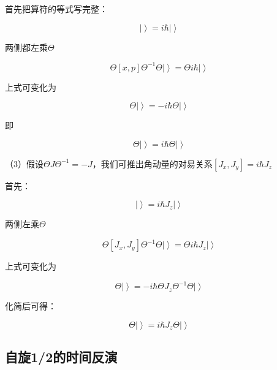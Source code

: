 首先把算符的等式写完整：

\begin{equation}
[x, p] \left| {} \right\rangle  = i \hbar \left| {} \right\rangle
\end{equation}

两侧都左乘$\Theta$

\begin{equation}
\Theta [x, p] \Theta^{-1} \Theta \left| {} \right\rangle = \Theta i \hbar \left| {} \right\rangle  
\end{equation}

上式可变化为

\begin{equation}
[x, -p] \Theta \left| {} \right\rangle = - i \hbar \Theta \left| {} \right\rangle
\end{equation}

即

\begin{equation}
[x, p] \Theta \left| {} \right\rangle = i \hbar \Theta \left| {} \right\rangle
\end{equation}

（3）假设$\Theta J \Theta^{-1} = -J$，我们可推出角动量的对易关系$[ J_x, J_y ] = i \hbar J_z $

首先：

\begin{equation}
[ J_x, J_y ] \left| {} \right\rangle = i \hbar J_z \left| {} \right\rangle
\end{equation}

两侧左乘$\Theta$

\begin{equation}
\Theta [ J_x, J_y ] \Theta^{-1} \Theta \left| {} \right\rangle = \Theta i \hbar J_z \left| {} \right\rangle
\end{equation}

上式可变化为

\begin{equation}
[ -J_x, -J_y  ] \Theta \left| {} \right\rangle = - i \hbar \Theta J_z \Theta^{-1} \Theta \left| {} \right\rangle
\end{equation}

化简后可得：

\begin{equation}
[J_x, J_y] \Theta \left| {} \right\rangle = i \hbar J_z \Theta \left| {} \right\rangle
\end{equation}

\subsection{自旋1/2的时间反演}

